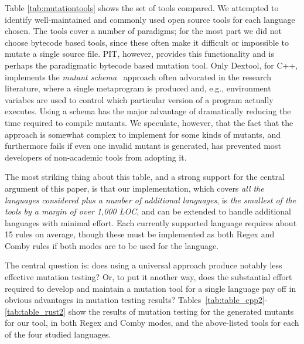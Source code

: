 \documentclass[sigconf,review, anonymous]{acmart}
\begin{document}
{Table \ref{tab:mutationtools} shows the set of tools compared.  We
attempted to identify well-maintained and commonly used open
source tools for each
language chosen.  The tools cover a number of paradigms; for the most
part we did not choose bytecode based tools, since these often make it
difficult or impossible to mutate a single source file.  PIT, however,
provides this functionality and is perhaps the paradigmatic bytecode
based mutation tool.  Only Dextool, for C++, implements the
\emph{mutant schema}~\cite{untch1993mutation} approach often advocated
in the research literature, where a single metaprogram is produced
and, e.g., environment variabes are used to control which particular
version of a program actually executes.  Using a schema has the major
advantage of dramatically reducing the time required to compile
mutants.  We speculate, however, that the fact that the approach is
somewhat complex to implement for some kinds of mutants, and
furthermore fails if even one invalid mutant is generated, has
prevented most developers of non-academic tools from adopting it.

The most striking thing about this table, and a strong support for
the central argument of this paper, is that our implementation, which
covers \emph{all the languages considered plus a number of additional
languages}, is \emph{the smallest of the tools by a margin of over 1,000 LOC},
and can be extended to handle additional languages with minimal
effort.  Each currently supported language requires about 15 rules on
average, though these must be implemented as both Regex and Comby
rules if both modes are to be used for the language.

The central question is: does using a universal approach produce
notably less effective mutation testing?  Or, to put it another way,
does the substantial effort required to develop and maintain a
mutation tool for a single language pay off in obvious advantages in
mutation testing results?
Tables~\ref{tab:table_cpp2}-\ref{tab:table_rust2} show the results of
mutation testing for the generated mutants for our tool, in both Regex
and Comby modes, and the above-listed tools for each of the four
studied languages.

}
\end{document}
